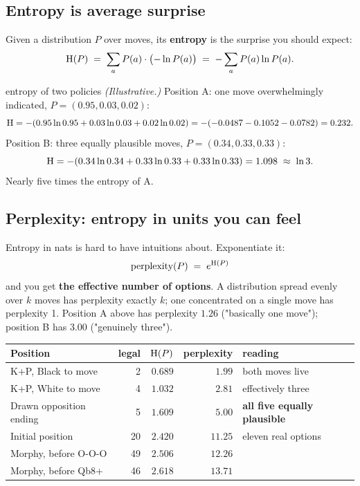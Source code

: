 \subsection{Entropy is average surprise}

Given a distribution $P$ over moves, its \textbf{entropy} is the surprise you should expect:
\begin{equation}
  \label{eq:entropy}
  \operatorname{H}(P) \;=\; \sum_a P(a)\cdot\bigl(-\ln P(a)\bigr) \;=\; -\sum_a P(a)\ln P(a).
\end{equation}

\begin{worked}{entropy of two policies}
\emph{(Illustrative.)} Position A: one move overwhelmingly indicated,
$P = (0.95, 0.03, 0.02)$:
\[
\operatorname{H} = -(0.95\ln0.95 + 0.03\ln0.03 + 0.02\ln0.02)
     = -(-0.0487 - 0.1052 - 0.0782) = 0.232 .
\]
Position B: three equally plausible moves, $P = (0.34, 0.33, 0.33)$:
\[
\operatorname{H} = -(0.34\ln0.34 + 0.33\ln0.33 + 0.33\ln0.33) = 1.098 \;\approx\; \ln 3 .
\]
Nearly five times the entropy of A.
\end{worked}

\subsection{Perplexity: entropy in units you can feel}

Entropy in nats is hard to have intuitions about. Exponentiate it:
\begin{equation}
  \label{eq:perplexity}
  \text{perplexity}(P) \;=\; e^{\operatorname{H}(P)}
\end{equation}
and you get \textbf{the effective number of options}. A distribution spread evenly over $k$
moves has perplexity exactly $k$; one concentrated on a single move has perplexity 1. Position
A above has perplexity $1.26$ ("basically one move"); position B has $3.00$ ("genuinely three").

\begin{realdata}[title={Real engine output: policy perplexity of this book's positions}]
\begin{center}
\begin{tabular}{@{}lrrrl@{}}
\toprule
Position & legal & $\operatorname{H}(P)$ & perplexity & reading \\
\midrule
K+P, Black to move & 2 & $0.689$ & $1.99$ & both moves live \\
K+P, White to move & 4 & $1.032$ & $2.81$ & effectively three \\
Drawn opposition ending & 5 & $1.609$ & $\mathbf{5.00}$ & \textbf{all five equally plausible} \\
Initial position & 20 & $2.420$ & $11.25$ & eleven real options \\
Morphy, before O-O-O & 49 & $2.506$ & $12.26$ & \\
Morphy, before Qb8+ & 46 & $2.618$ & $13.71$ & \\
\bottomrule
\end{tabular}
\end{center}
\end{realdata}

